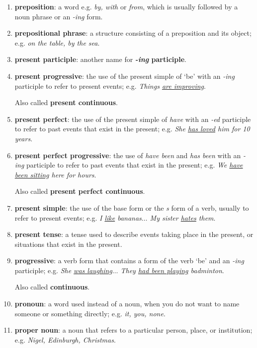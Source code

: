 \documentclass[oneside]{book}
\numberwithin{equation}{section}
\begin{document}
\begin{enumerate}
    Cf. \textbf{attributive}.
    \item \textbf{preposition}: a word e.g. \textit{by, with} or \textit{from}, which is usually followed by a noun phrase or an \textit{-ing} form.
    \item \textbf{prepositional phrase}: a structure consisting of a preposition and its object; e.g. \textit{on the table, by the sea}.
    \item \textbf{present participle}: another name for \textbf{\textit{-ing} participle}.
    \item \textbf{present progressive}: the use of the present simple of `be' with an \textit{-ing} participle to refer to present events; e.g. \textit{Things \underline{are improving}}.
    
    Also called \textbf{present continuous}.
    \item \textbf{present perfect}: the use of the present simple of \textit{have} with an \textit{-ed} participle to refer to past events that exist in the present; e.g. \textit{She \underline{has loved} him for 10 years}.
    \item \textbf{present perfect progressive}: the use of \textit{have been} and \textit{has been} with an \textit{-ing} participle to refer to past events that exist in the present; e.g. \textit{We \underline{have been sitting} here for hours}.
    
    Also called \textbf{present perfect continuous}.
    \item \textbf{present simple}: the use of the base form or the \textit{s} form of a verb, usually to refer to present events; e.g. \textit{I \underline{like} bananas$\ldots$ My sister \underline{hates} them}.
    \item \textbf{present tense}: a tense used to describe events taking place in the present, or situations that exist in the present.
    \item \textbf{progressive}: a verb form that contains a form of the verb `be' and an \textit{-ing} participle; e.g. \textit{She \underline{was laughing}$\ldots$ They \underline{had been playing} badminton}.
    
    Also called \textbf{continuous}.
    \item \textbf{pronoun}: a word used instead of a noun, when you do not want to name someone or something directly; e.g. \textit{it, you, none}.
    \item \textbf{proper noun}: a noun that refers to a particular person, place, or institution; e.g. \textit{Nigel, Edinburgh, Christmas}.
    

\end{enumerate}
\end{document}
